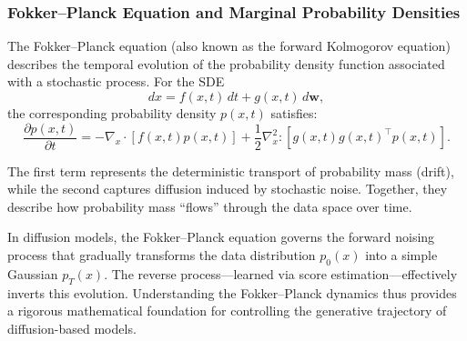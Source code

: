 \subsubsection{Fokker--Planck Equation and Marginal Probability Densities}

The Fokker--Planck equation (also known as the forward Kolmogorov equation) describes the temporal evolution of the probability density function associated with a stochastic process. For the SDE
\begin{equation}
    dx = f(x, t)\,dt + g(x, t)\,d\mathbf{w},
\end{equation}
the corresponding probability density \( p(x, t) \) satisfies:
\begin{equation}
    \frac{\partial p(x, t)}{\partial t}
    = -\nabla_x \cdot [f(x, t)p(x, t)]
    + \frac{1}{2} \nabla_x^2 : [g(x, t)g(x, t)^\top p(x, t)].
\end{equation}

The first term represents the deterministic transport of probability mass (drift), while the second captures diffusion induced by stochastic noise. Together, they describe how probability mass “flows” through the data space over time.  

In diffusion models, the Fokker--Planck equation governs the forward noising process that gradually transforms the data distribution \( p_0(x) \) into a simple Gaussian \( p_T(x) \). The reverse process—learned via score estimation—effectively inverts this evolution. Understanding the Fokker--Planck dynamics thus provides a rigorous mathematical foundation for controlling the generative trajectory of diffusion-based models.
